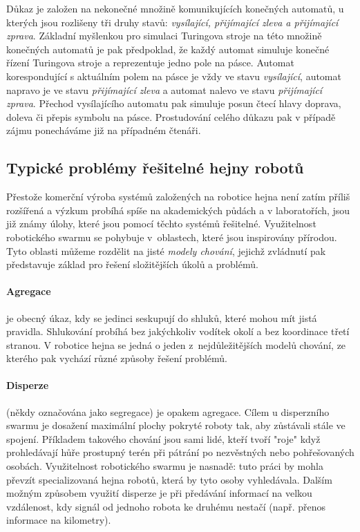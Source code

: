\documentclass[a4paper,12pt]{article}
\begin{document}
Důkaz je založen na nekonečné množině komunikujících konečných automatů, u kterých jsou
rozlišeny tři druhy stavů: {\it vysílající, přijímající zleva a přijímající zprava}.
Základní myšlenkou pro simulaci Turingova stroje na této množině konečných automatů je
pak předpoklad, že každý automat simuluje konečné řízení Turingova stroje a reprezentuje
jedno pole na pásce. Automat korespondující s aktuálním polem na pásce je vždy ve stavu
{\it vysílající}, automat napravo je ve stavu {\it přijímající zleva} a automat
nalevo ve stavu {\it přijímající zprava}. Přechod vysílajícího automatu pak simuluje
posun čtecí hlavy doprava, doleva či přepis symbolu na pásce. Prostudování celého důkazu
pak v případě zájmu ponecháváme již na případném čtenáři. \cite{Dudek93}


\subsection{Typické problémy řešitelné hejny robotů}
Přestože komerční výroba systémů založených na robotice hejna není zatím příliš rozšířená
a výzkum probíhá spíše na akademických půdách a v laboratořích, jsou již známy úlohy,
které jsou pomocí těchto systémů řešitelné. Využitelnost robotického swarmu se pohybuje
v~oblastech, které jsou inspirovány přírodou. Tyto oblasti můžeme rozdělit na jisté {\it modely
chování}, jejichž zvládnutí pak představuje základ pro řešení složitějších úkolů a problémů.

\paragraph{Agregace} je obecný úkaz, kdy se jedinci seskupují do shluků, které mohou mít jistá
pravidla. Shlukování probíhá bez jakýchkoliv vodítek okolí a bez koordinace třetí stranou.
V robotice hejna se jedná o jeden z~nejdůležitějších modelů chování, ze kterého pak vychází
různé způsoby řešení problémů.
\paragraph{Disperze} (někdy označována jako segregace) je opakem agregace. Cílem u disperzního
swarmu je dosažení maximální plochy pokryté roboty tak, aby zůstávali stále ve spojení. Příkladem
takového chování jsou sami lidé, kteří tvoří "roje" když prohledávají hůře prostupný terén při
pátrání po nezvěstných nebo pohřešovaných osobách. Využitelnost robotického swarmu je nasnadě:
tuto práci by mohla převzít specializovaná hejna robotů, která by tyto osoby vyhledávala. Dalším
možným způsobem využití disperze je při předávání informací na velkou vzdálenost, kdy signál
od jednoho robota ke druhému nestačí (např. přenos informace na kilometry).
\end{document}
